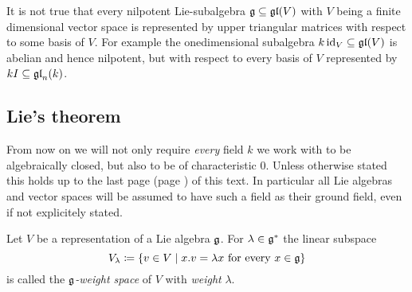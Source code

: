 \begin{warn}
 It is not true that every nilpotent Lie-subalgebra $\mathfrak{g} \subseteq \mathfrak{gl}(V)$ with $V$ being a finite dimensional vector space is represented by upper triangular matrices with respect to some basis of $V$. For example the onedimensional subalgebra $k \operatorname{id}_V \subseteq \mathfrak{gl}(V)$ is abelian and hence nilpotent, but with respect to every basis of $V$ represented by $kI \subseteq \mathfrak{gl}_n(k)$.
\end{warn}





\subsection{Lie’s theorem}


From now on we will not only require \emph{every} field $k$ we work with to be algebraically closed, but also to be of characteristic $0$. Unless otherwise stated this holds up to the last page (page \pageref{LastPage}) of this text. In particular all Lie algebras and vector spaces will be assumed to have such a field as their ground field, even if not explicitely stated.


\begin{defi}
 Let $V$ be a representation of a Lie algebra $\mathfrak{g}$. For $\lambda \in \mathfrak{g}^*$ the linear subspace
 \[
  V_\lambda \coloneqq \{v \in V \mid \text{$x.v = \lambda x$ for every $x \in \mathfrak{g}$}\}
 \]
 is called the \emph{$\mathfrak{g}$-weight space} of $V$ with \emph{weight} $\lambda$.
\end{defi}




